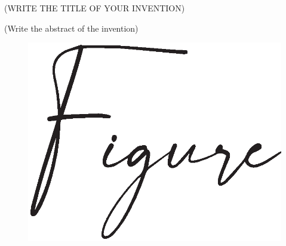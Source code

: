 
\begin{center}
	\MakeUppercase
	{
			(Write the title of your invention)
	}
\end{center}



	(Write the abstract of the invention)
	
	
	
	

	
	\setcounter{figure}{22}




\vfill
\begin{figure}[h!]
	\centering
	
	
	
	
		
		\includegraphics[scale=0.50]{figures/figure.eps}
	
	
	
	
	\caption{}
\end{figure}
